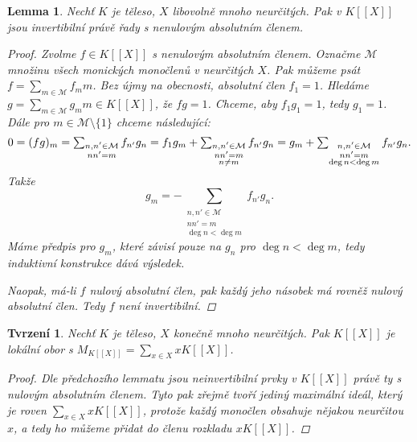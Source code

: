 \documentclass[11pt,a4paper]{article}
\newcommand\p[1]{\mathcal{ #1 }} %
\newcommand*{\ml}[1]{\[\textstyle\let\displaystyle\textstyle#1\]}	%
\newcounter{numb}
\theoremstyle{definition}
\theoremstyle{plain}
\newtheorem{lemma}[numb]{Lemma}
\newtheorem{tvrzeni}[numb]{Tvrzení}
\begin{document}
\begin{lemma} \label{thm:KX_inv}
	Nechť $K$ je těleso, $X$ libovolně mnoho neurčitých. Pak v $K[[X]]$ jsou invertibilní právě řady s nenulovým absolutním členem.

	\begin{proof}
		Zvolme $f \in K[[X]]$ s nenulovým absolutním členem. Označme $\p M$ množinu všech monických monočlenů v neurčitých $X$. Pak můžeme psát $f = \sum_{m \in \p M} f_m m$. Bez újmy na obecnosti, absolutní člen $f_1 = 1$. Hledáme $g = \sum_{m \in \p M} g_m m \in K[[X]]$, že $f g = 1$. Chceme, aby $f_1 g_1 = 1$, tedy $g_1 = 1$. Dále pro $m \in \p M \setminus \{1\}$ chceme následující:
		\ml{
			0 = (f g)_m = \sum_{\substack{n, n' \in \p M\\ n n' = m}} f_{n'} g_n = f_1 g_m + \sum_{\substack{n, n' \in \p M\\ n n' = m\\ n \not= m}} f_{n'} g_n = g_m + \sum_{\substack{n, n' \in \p M\\ n n' = m\\ \deg n < \deg m}} f_{n'} g_n.
		}
		Takže
		\begin{equation*} \label{eq:inv}
			\textstyle
			g_m = -\sum_{\substack{n, n' \in \p M\\ n n' = m\\ \deg n < \deg m}} f_{n'} g_n \tag{$\ast$}.
		\end{equation*}
		Máme předpis pro $g_m$, které závisí pouze na $g_n$ pro $\deg n < \deg m$, tedy induktivní konstrukce dává výsledek.

		Naopak, má-li $f$ nulový absolutní člen, pak každý jeho násobek má rovněž nulový absolutní člen. Tedy $f$ není invertibilní.
	\end{proof}
\end{lemma}

\begin{tvrzeni}
	Nechť $K$ je těleso, $X$ konečně mnoho neurčitých. Pak $K[[X]]$ je lokální obor s $M_{K[[X]]} = \sum_{x \in X} x K[[X]]$.

	\begin{proof}
		Dle předchozího lemmatu jsou neinvertibilní prvky v $K[[X]]$ právě ty s nulovým absolutním členem. Tyto pak zřejmě tvoří jediný maximální ideál, který je roven $\sum_{x \in X} x K[[X]]$, protože každý monočlen obsahuje nějakou neurčitou $x$, a tedy ho můžeme přidat do členu rozkladu $x K[[X]]$.
	\end{proof}
\end{tvrzeni}
\end{document}
